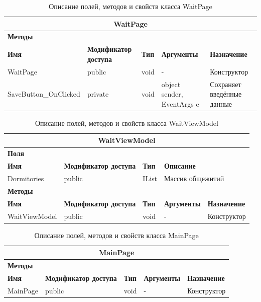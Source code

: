 \documentclass{../includes/TechDoc}
\begin{document}
    \begin{table}[ht]
        \caption{\label{tab:class-waitpage-table}Описание полей, методов и свойств класса WaitPage}
        \centering
        \begin{tabular}{|l|p{3cm}|l|p{3cm}|p{5cm}|}
            \hline
            \multicolumn{5}{|c|}{WaitPage} \\ \hline
            \multicolumn{5}{|l|}{\textbf{Методы}} \\ \hline
            \textbf{Имя} & \textbf{Модификатор доступа} & \textbf{Тип} & \textbf{Аргументы} & \textbf{Назначение} \\ \hline
            WaitPage & public & void & - & Конструктор \\ \hline
            SaveButton\_OnClicked & private & void & object sender, EventArgs e & Сохраняет введённые данные \\ \hline
        \end{tabular}
    \end{table}

    \begin{table}[ht]
        \caption{\label{tab:class-waitviewmodel-table}Описание полей, методов и свойств класса WaitViewModel}
        \centering
        \begin{tabular}{|l|p{3cm}|l|p{3cm}|p{5cm}|}
            \hline
            \multicolumn{5}{|c|}{WaitViewModel} \\ \hline
            \multicolumn{5}{|l|}{\textbf{Поля}} \\ \hline
            \textbf{Имя} & \textbf{Модификатор доступа} & \textbf{Тип} & \multicolumn{2}{l|}{\textbf{Описание}} \\ \hline
            Dormitories & public & IList & \multicolumn{2}{l|}{Массив общежитий} \\ \hline
            \multicolumn{5}{|l|}{\textbf{Методы}} \\ \hline
            \textbf{Имя} & \textbf{Модификатор доступа} & \textbf{Тип} & \textbf{Аргументы} & \textbf{Назначение} \\ \hline
            WaitViewModel & public & void & - & Конструктор \\ \hline
        \end{tabular}
    \end{table}

    \begin{table}[ht]
        \caption{\label{tab:class-mainpage-table}Описание полей, методов и свойств класса MainPage}
        \centering
        \begin{tabular}{|l|p{3cm}|l|p{3cm}|p{5cm}|}
            \hline
            \multicolumn{5}{|c|}{MainPage} \\ \hline
            \multicolumn{5}{|l|}{\textbf{Методы}} \\ \hline
            \textbf{Имя} & \textbf{Модификатор доступа} & \textbf{Тип} & \textbf{Аргументы} & \textbf{Назначение} \\ \hline
            MainPage & public & void & - & Конструктор \\ \hline
        \end{tabular}
    \end{table}
\end{document}
